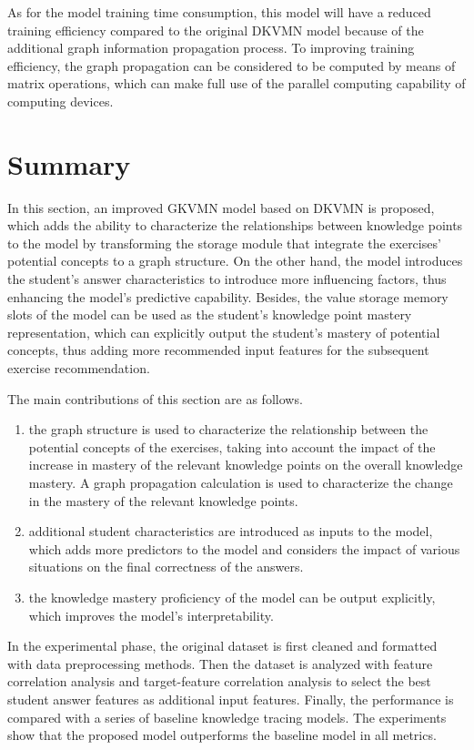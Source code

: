 As for the model training time consumption, this model will have a reduced training efficiency compared to the original DKVMN model because of the additional graph information propagation process. To improving training efficiency, the graph propagation can be considered to be computed by means of matrix operations, which can make full use of the parallel computing capability of computing devices.

\section{Summary}
In this section, an improved GKVMN model based on DKVMN is proposed, which adds the ability to characterize the relationships between knowledge points to the model by transforming the storage module that integrate the exercises' potential concepts to a graph structure. On the other hand, the model introduces the student's answer characteristics to introduce more influencing factors, thus enhancing the model's predictive capability. Besides, the value storage memory slots of the model can be used as the student's knowledge point mastery representation, which can explicitly output the student's mastery of potential concepts, thus adding more recommended input features for the subsequent exercise recommendation.

The main contributions of this section are as follows.
\begin{enumerate}
    \item the graph structure is used to characterize the relationship between the potential concepts of the exercises, taking into account the impact of the increase in mastery of the relevant knowledge points on the overall knowledge mastery. A graph propagation calculation is used to characterize the change in the mastery of the relevant knowledge points.
    \item additional student characteristics are introduced as inputs to the model, which adds more predictors to the model and considers the impact of various situations on the final correctness of the answers.
    \item the knowledge mastery proficiency of the model can be output explicitly, which improves the model's interpretability.
\end{enumerate}

In the experimental phase, the original dataset is first cleaned and formatted with data preprocessing methods. Then the dataset is analyzed with feature correlation analysis and target-feature correlation analysis to select the best student answer features as additional input features. Finally, the performance is compared with a series of baseline knowledge tracing models. The experiments show that the proposed model outperforms the baseline model in all metrics.